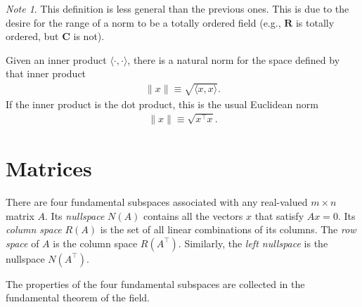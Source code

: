 \documentclass[]{article}
\theoremstyle{plain}
\theoremstyle{definition}
\theoremstyle{remark}
\newtheorem*{note}{Note}
\newcommand{\reals}{\mathbf{R}}
\newcommand{\complex}{\mathbf{C}}
\begin{document}
\begin{note}
This definition is less general than the previous ones.  This is due
to the desire for the range of a norm to be a totally ordered field
(e.g., $\reals$ is totally ordered, but $\complex$ is not).
\end{note}

Given an inner product $\langle\cdot,\cdot\rangle$, there is a natural norm
for the space defined by that inner product
\begin{align*}
\|x\| \equiv \sqrt{\langle x, x\rangle}.
\end{align*}
If the inner product is the dot product, this is the usual Euclidean norm
\begin{align*}
\|x\| \equiv \sqrt{x^\top x}.
\end{align*}


\section{Matrices}\label{matrices}

There are four fundamental subspaces associated with any real-valued
$m \times n$ matrix $A$. Its \emph{nullspace} $N(A)$ contains all the vectors
$x$ that satisfy $Ax=0$.  Its \emph{column space} $R(A)$ is the set of all
linear combinations of its columns. The \emph{row space} of $A$ is the column
space $R(A^\top)$. Similarly, the \emph{left nullspace} is the nullspace
$N(A^\top)$.

The properties of the four fundamental subspaces are collected in the
fundamental theorem of the field.
\end{document}
